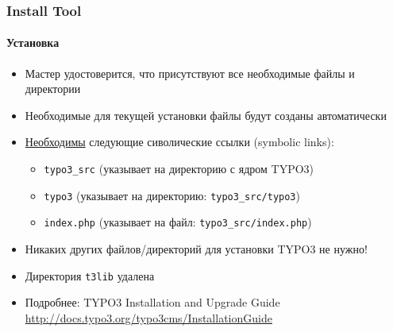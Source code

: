 
\begin{frame}[fragile]

	\frametitle{Install Tool}
	\framesubtitle{Установка}

	\begin{itemize}
		\item Мастер удостоверится, что присутствуют все необходимые файлы и директории
		\item Необходимые для текущей установки файлы будут созданы автоматически
		\item \underline{Необходимы} следующие сиволические ссылки (symbolic links):

		\begin{itemize}
			\item \texttt{typo3\_src}	\tabto{2cm} (указывает на директорию с ядром TYPO3)
			\item \texttt{typo3}		\tabto{2cm} (указывает на директорию: \texttt{typo3\_src/typo3})
			\item \texttt{index.php}	\tabto{2cm} (указывает на файл: \texttt{typo3\_src/index.php})
		\end{itemize}

		\item Никаких других файлов/директорий для установки TYPO3 не нужно!
		\item Директория \texttt{t3lib} удалена
		\item Подробнее: TYPO3 Installation and Upgrade Guide\newline
			\url{http://docs.typo3.org/typo3cms/InstallationGuide}

	\end{itemize}

\end{frame}


